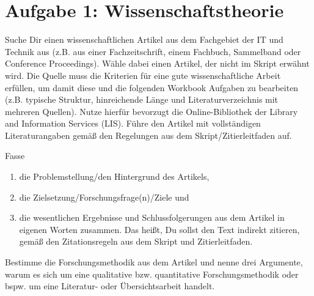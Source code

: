 \section*{Aufgabe 1: Wissenschaftstheorie}

\begin{enumerate}
	\itshape{
	\item Suche Dir einen wissenschaftlichen Artikel aus dem Fachgebiet der IT und Technik aus (z.B. aus einer Fachzeitschrift, einem Fachbuch, Sammelband oder Conference Proceedings). Wähle dabei einen Artikel, der nicht im Skript erwähnt wird. Die Quelle muss die Kriterien für eine gute wissenschaftliche Arbeit erfüllen, um damit diese und die folgenden Workbook Aufgaben zu bearbeiten (z.B. typische Struktur, hinreichende Länge und Literaturverzeichnis mit mehreren Quellen). Nutze hierfür bevorzugt die Online-Bibliothek der Library and Information Services (LIS). Führe den Artikel mit vollständigen Literaturangaben gemäß den Regelungen aus dem Skript/Zitierleitfaden auf.
	\item Fasse
	      \begin{enumerate}
		      \item die Problemstellung/den Hintergrund des Artikels,
		      \item die Zielsetzung/Forschungsfrage(n)/Ziele und
		      \item die wesentlichen Ergebnisse und Schlussfolgerungen aus dem Artikel in eigenen Worten zusammen. Das heißt, Du sollst den Text indirekt zitieren, gemäß den Zitationsregeln aus dem Skript und Zitierleitfaden.
	      \end{enumerate}
	\item Bestimme die Forschungsmethodik aus dem Artikel und nenne drei Argumente, warum es sich um eine qualitative bzw. quantitative Forschungsmethodik oder bspw. um eine Literatur- oder Übersichtsarbeit handelt.}
\end{enumerate}
